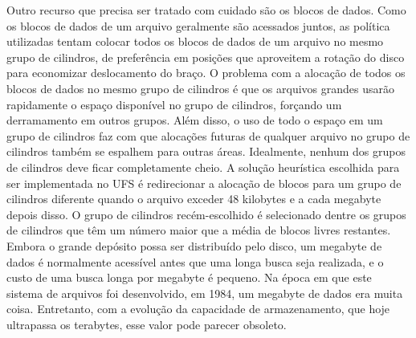 Outro recurso que precisa ser tratado com cuidado são os blocos de dados. Como os blocos de dados de um arquivo geralmente são acessados juntos, as política utilizadas tentam colocar todos os blocos de dados de um arquivo no mesmo grupo de cilindros, de preferência em posições que aproveitem a rotação do disco para economizar deslocamento do braço. O problema com a alocação de todos os blocos de dados no mesmo grupo de cilindros é que os arquivos grandes usarão rapidamente o espaço disponível no grupo de cilindros, forçando um derramamento em outros grupos. Além disso, o uso de todo o espaço em um grupo de cilindros faz com que alocações futuras de qualquer arquivo no grupo de cilindros também se espalhem para outras áreas. Idealmente, nenhum dos grupos de cilindros deve ficar completamente cheio. A solução heurística escolhida para ser implementada no UFS é redirecionar a alocação de blocos para um grupo de cilindros diferente quando o arquivo exceder 48 kilobytes e a cada megabyte depois disso. O grupo de cilindros recém-escolhido é selecionado dentre os grupos de cilindros que têm um número maior que a média de blocos livres restantes. Embora o grande depósito possa ser distribuído pelo disco, um megabyte de dados é normalmente acessível antes que uma longa busca seja realizada, e o custo de uma busca longa por megabyte é pequeno. 
Na época em que este sistema de arquivos foi desenvolvido, em 1984, um megabyte de dados era muita coisa. Entretanto, com a evolução da capacidade de armazenamento, que hoje ultrapassa os terabytes, esse valor pode parecer obsoleto.